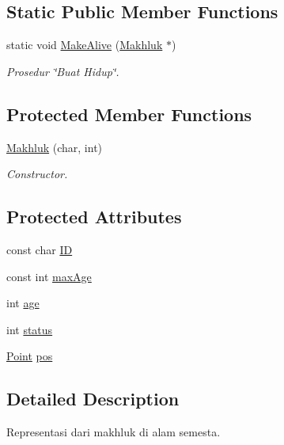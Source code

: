 \subsection*{Static Public Member Functions}
\begin{DoxyCompactItemize}
\item 
static void \hyperlink{class_makhluk_a46b686a6f1533958650a60e3d7268b99}{Make\+Alive} (\hyperlink{class_makhluk}{Makhluk} $\ast$)
\begin{DoxyCompactList}\small\item\em Prosedur \char`\"{}\+Buat Hidup\char`\"{}. \end{DoxyCompactList}\end{DoxyCompactItemize}
\subsection*{Protected Member Functions}
\begin{DoxyCompactItemize}
\item 
\hyperlink{class_makhluk_afd36e7fe75e525a38d5cfc8a1e6b48be}{Makhluk} (char, int)
\begin{DoxyCompactList}\small\item\em Constructor. \end{DoxyCompactList}\end{DoxyCompactItemize}
\subsection*{Protected Attributes}
\begin{DoxyCompactItemize}
\item 
const char \hyperlink{class_makhluk_a287dd5d101d81990399f00f4a77a36f5}{ID}
\item 
const int \hyperlink{class_makhluk_a50350ef02b62af484c769b8118f8c4ae}{max\+Age}
\item 
int \hyperlink{class_makhluk_aacf25b9c59e644e709b730f5239996f6}{age}
\item 
int \hyperlink{class_makhluk_aa3eefed357a56f6b86f0080083d91d31}{status}
\item 
\hyperlink{class_point}{Point} \hyperlink{class_makhluk_a920e46e39a404909a292802669bed0c2}{pos}
\end{DoxyCompactItemize}


\subsection{Detailed Description}
Representasi dari makhluk di alam semesta. 

